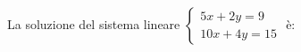 La soluzione del sistema lineare 
$\left\{\begin{matrix}5x+2y=9\\10x+4y=15\end{matrix}\right.$ 
è: 
